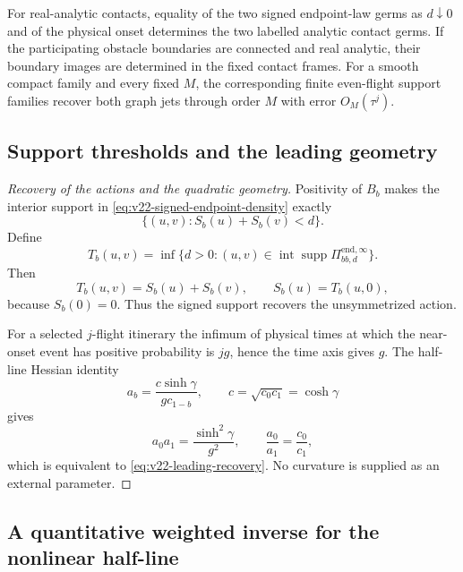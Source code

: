 \begin{theorem}
For real-analytic contacts, equality of the two signed endpoint-law germs as
$d\downarrow0$ and of the physical onset determines the two labelled analytic
contact germs.  If the participating obstacle boundaries are connected and
real analytic, their boundary images are determined in the fixed contact
frames.  For a smooth compact family and every fixed $M$, the corresponding
finite even-flight support families recover both graph jets through order
$M$ with error $O_M(\tau^j)$.
\end{theorem}

\subsection{Support thresholds and the leading geometry}

\begin{proof}[Recovery of the actions and the quadratic geometry]
Positivity of $B_b$ makes the interior support in
\eqref{eq:v22-signed-endpoint-density} exactly
\[
                  \{(u,v):S_b(u)+S_b(v)<d\}.
\]
Define
\[
 T_b(u,v)=\inf\{d>0:(u,v)\in
       \operatorname{int}\operatorname{supp}
       \Pi^{\mathrm{end},\infty}_{bb,d}\}.
\]
Then
\begin{equation}\label{eq:v22-support-threshold}
             T_b(u,v)=S_b(u)+S_b(v),\qquad S_b(u)=T_b(u,0),
\end{equation}
because $S_b(0)=0$.  Thus the signed support recovers the unsymmetrized
action.

For a selected $j$-flight itinerary the infimum of physical times at which
the near-onset event has positive probability is $jg$, hence the time axis
gives $g$.  The half-line Hessian identity
\[
 a_b=\frac{c\sinh\gamma}{gc_{1-b}},
 \qquad c=\sqrt{c_0c_1}=\cosh\gamma
\]
gives
\[
 a_0a_1=\frac{\sinh^2\gamma}{g^2},
 \qquad \frac{a_0}{a_1}=\frac{c_0}{c_1},
\]
which is equivalent to \eqref{eq:v22-leading-recovery}.  No curvature is
supplied as an external parameter.
\end{proof}

\subsection{A quantitative weighted inverse for the nonlinear half-line}

